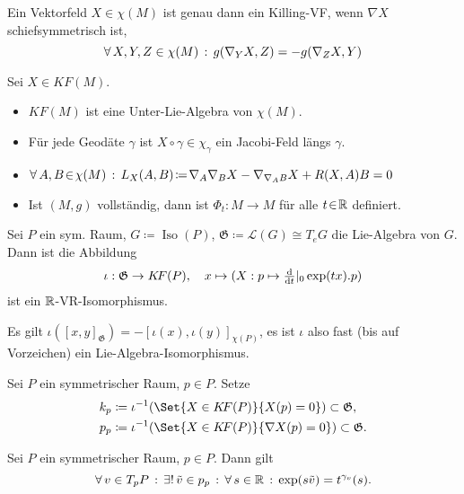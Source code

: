 \documentclass{cheat-sheet}
\DeclareMathOperator{\Iso}{Iso} %
\newcommand{\Gie}{\mathfrak{G}} %
\newcommand{\KF}{K\!F} %
\begin{document}
\begin{lem}
  Ein Vektorfeld $X \in \chi(M)$ ist genau dann ein Killing-VF, wenn $\nabla X$ schiefsymmetrisch ist, \dh{}
  \[ \forall \, {X, Y, Z \in \chi(M)} \,:\, g(\nabla_Y X, Z) = - g(\nabla_Z X, Y) \]
\end{lem}

\begin{facts}
  Sei $X \in \KF(M)$.
  \begin{itemize}
    \item $\KF(M)$ ist eine Unter-Lie-Algebra von $\chi(M)$.
    \item Für jede Geodäte $\gamma$ ist $X \circ \gamma \in \chi_\gamma$ ein Jacobi-Feld längs $\gamma$.
    \item $\forall \, {A, B \!\in\! \chi(M)} \,:\, L_X(A, B) \!\coloneqq\! \nabla_A \nabla_B X - \nabla_{\nabla_A B} X + R(X, A)B = 0$
    \item Ist $(M, g)$ vollständig, dann ist $\Phi_t : M \!\to\! M$ für alle $t \!\in\! \mathbb{R}$ definiert.
  \end{itemize}
\end{facts}


\begin{satz}
  Sei $P$ ein sym. Raum, $G \coloneqq \Iso(P)$, $\Gie \coloneqq \mathcal{L}(G) \cong T_e G$ die Lie-Algebra von $G$. Dann ist die Abbildung
  \[
    \iota : \Gie \to \KF(P), \quad
    x \mapsto (X : p \mapsto \tfrac{\d}{\d t}|_0 \exp(tx).p)
  \]
  ist ein $\mathbb{R}$-VR-Isomorphismus.
\end{satz}

\begin{acht}
  Es gilt $\iota([x, y]_\Gie) = - [\iota(x), \iota(y)]_{\chi(P)}$, es ist $\iota$ also fast (bis auf Vorzeichen) ein Lie-Algebra-Isomorphismus.
\end{acht}

\begin{defn}
  Sei $P$ ein symmetrischer Raum, $p \in P$. Setze
  \begin{align*}
    k_p & \coloneqq \iota^{-1}(\Set{X \in \KF(P)}{X(p) = 0}) \subset \Gie, \\
    p_p & \coloneqq \iota^{-1}(\Set{X \in \KF(P)}{\nabla X(p) = 0}) \subset \Gie.
  \end{align*}
\end{defn}

\begin{lem}
  Sei $P$ ein symmetrischer Raum, $p \in P$. Dann gilt
  \[ \forall \, {v \in T_p P} \,:\, \exists! \, {\tilde{v} \in p_p} \,:\, \forall \, {s \in \mathbb{R}} \,:\, \exp(s \tilde{v}) = t^{\gamma_v}(s). \]
\end{lem}
\end{document}
